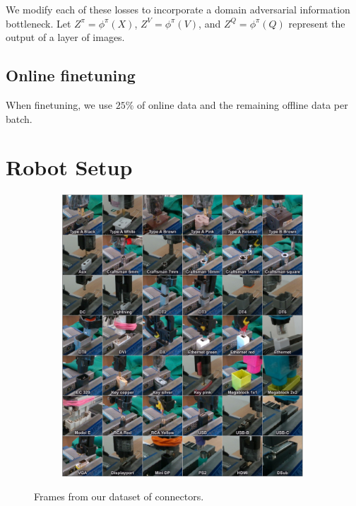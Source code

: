 We modify each of these losses to incorporate a domain adversarial information bottleneck.
Let $Z^\pi = \phi^\pi(X)$, $Z^V = \phi^\pi(V)$, and $Z^Q = \phi^\pi(Q)$ represent the output of a \methodabbrv{} layer of images.



\subsection{Online finetuning}

When finetuning, we use $25\%$ of online data and the remaining offline data per batch.

\section{Robot Setup}

\begin{figure}[t]
    \centering
    \begin{subfigure}[b]{0.99\linewidth}
        \center
        \includegraphics[width=0.99\textwidth]{daib/imgs/connectors.pdf}
    \end{subfigure}

    \caption{Frames from our dataset of \numconnectors{} connectors.}
    \label{fig:connectortable}
    \vspace{-0.5cm}
\end{figure}

